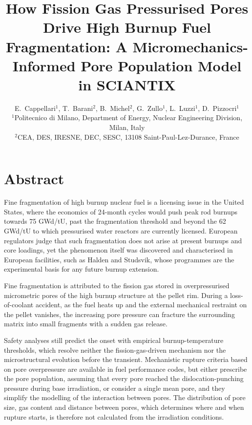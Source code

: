 \documentclass[11pt,a4paper]{article}
\title{\textbf{How Fission Gas Pressurised Pores Drive High Burnup Fuel Fragmentation: A Micromechanics-Informed Pore Population Model in SCIANTIX}}
\author{E.~Cappellari$^{1}$, T.~Barani$^{2}$, B.~Michel$^{2}$, G.~Zullo$^{1}$, L.~Luzzi$^{1}$, D.~Pizzocri$^{1}$\\[2pt]
\small $^{1}$Politecnico di Milano, Department of Energy, Nuclear Engineering Division, Milan, Italy\\
\small $^{2}$CEA, DES, IRESNE, DEC, SESC, 13108 Saint-Paul-Lez-Durance, France}
\date{}
\begin{document}
\maketitle

\section*{Abstract}

Fine fragmentation of high burnup nuclear fuel is a licensing issue in the United States, where the economics of 24-month cycles would push peak rod burnups towards 75 GWd/tU, past the fragmentation threshold and beyond the 62 GWd/tU to which pressurised water reactors are currently licensed. European regulators judge that such fragmentation does not arise at present burnups and core loadings, yet the phenomenon itself was discovered and characterised in European facilities, such as Halden and Studsvik, whose programmes are the experimental basis for any future burnup extension.

Fine fragmentation is attributed to the fission gas stored in overpressurised micrometric pores of the high burnup structure at the pellet rim. During a loss-of-coolant accident, as the fuel heats up and the external mechanical restraint on the pellet vanishes, the increasing pore pressure can fracture the surrounding matrix into small fragments with a sudden gas release.

Safety analyses still predict the onset with empirical burnup-temperature thresholds, which resolve neither the fission-gas-driven mechanism nor the microstructural evolution before the transient. Mechanistic rupture criteria based on pore overpressure are available in fuel performance codes, but either prescribe the pore population, assuming that every pore reached the dislocation-punching pressure during base irradiation, or consider a single mean pore, and they simplify the modelling of the interaction between pores. The distribution of pore size, gas content and distance between pores, which determines where and when rupture starts, is therefore not calculated from the irradiation conditions.
\end{document}

